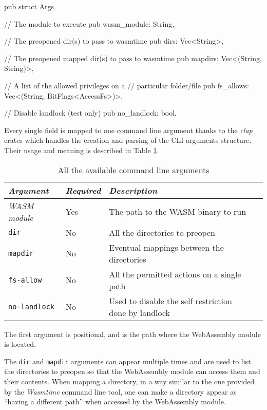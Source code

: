 \begin{code}[language=rust, caption=The \texttt{Args} struct, label=lst:arg-struct]
pub struct Args {
  // The module to execute
  pub wasm_module: String,

  // The preopened dir(s) to pass to wasmtime
  pub dirs: Vec<String>,

  // The preopened mapped dir(s) to pass to wasmtime
  pub mapdirs: Vec<(String, String)>,

  // A list of the allowed privileges on a
  // particular folder/file
  pub fs_allows: Vec<(String, BitFlags<AccessFs>)>,

  // Disable landlock (test only)
  pub no_landlock: bool,
}
\end{code}

Every single field is mapped to one command line argument thanks to the \textit{clap} crates which handles the
creation and parsing of the CLI arguments structure.
Their usage and meaning is described in Table \ref{table:landlock-cli-args}.

\begin{table}
  \centering
  \begin{tabular}{|l|l|l|l|}
    \hline
    \textit{Argument} & \textit{Required} & \textit{Description} \\
    \hline\hline
    \textit{WASM module} & Yes & The path to the WASM binary to run \\ \hline
    \texttt{dir} & No & All the directories to preopen \\ \hline
    \texttt{mapdir} & No & Eventual mappings between the directories \\ \hline
    \texttt{fs-allow} & No & All the permitted actions on a single path \\ \hline
    \texttt{no-landlock} & No & Used to disable the self restriction done by landlock \\
    \hline
  \end{tabular}
  \caption{All the available command line arguments}
  \label{table:landlock-cli-args}
\end{table}

The first argument is positional, and is the path where the WebAssembly module is located.

The \texttt{dir} and \texttt{mapdir} arguments can appear multiple times and are used to list the directories to preopen
so that the WebAssembly module can access them and their contents.
When mapping a directory, in a way similar to the one provided by the \textit{Wasmtime} command line tool, one can make a
directory appear as ``having a different path'' when accessed by the WebAssembly module.

